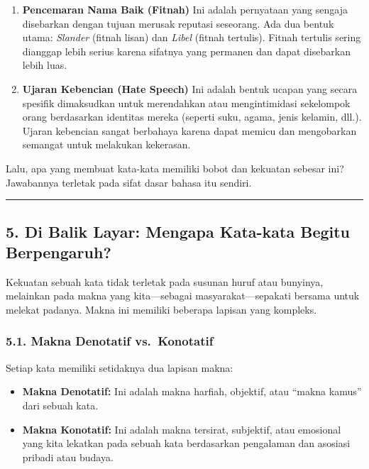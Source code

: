 \documentclass[
  letterpaper,
  DIV=11,
  numbers=noendperiod]{scrreprt}
\begin{document}
\begin{enumerate}
\def\labelenumi{\arabic{enumi}.}
\item
  \textbf{Pencemaran Nama Baik (Fitnah)} Ini adalah pernyataan yang
  sengaja disebarkan dengan tujuan merusak reputasi seseorang. Ada dua
  bentuk utama: \emph{Slander} (fitnah lisan) dan \emph{Libel} (fitnah
  tertulis). Fitnah tertulis sering dianggap lebih serius karena
  sifatnya yang permanen dan dapat disebarkan lebih luas.
\item
  \textbf{Ujaran Kebencian (Hate Speech)} Ini adalah bentuk ucapan yang
  secara spesifik dimaksudkan untuk merendahkan atau mengintimidasi
  sekelompok orang berdasarkan identitas mereka (seperti suku, agama,
  jenis kelamin, dll.). Ujaran kebencian sangat berbahaya karena dapat
  memicu dan mengobarkan semangat untuk melakukan kekerasan.
\end{enumerate}

Lalu, apa yang membuat kata-kata memiliki bobot dan kekuatan sebesar
ini? Jawabannya terletak pada sifat dasar bahasa itu sendiri.

\begin{center}\rule{0.5\linewidth}{0.5pt}\end{center}

\subsection{5. Di Balik Layar: Mengapa Kata-kata Begitu
Berpengaruh?}\label{di-balik-layar-mengapa-kata-kata-begitu-berpengaruh}

Kekuatan sebuah kata tidak terletak pada susunan huruf atau bunyinya,
melainkan pada makna yang kita---sebagai masyarakat---sepakati bersama
untuk melekat padanya. Makna ini memiliki beberapa lapisan yang
kompleks.

\subsubsection{5.1. Makna Denotatif
vs.~Konotatif}\label{makna-denotatif-vs.-konotatif}

Setiap kata memiliki setidaknya dua lapisan makna:

\begin{itemize}
\item
  \textbf{Makna Denotatif:} Ini adalah makna harfiah, objektif, atau
  ``makna kamus'' dari sebuah kata.
\item
  \textbf{Makna Konotatif:} Ini adalah makna tersirat, subjektif, atau
  emosional yang kita lekatkan pada sebuah kata berdasarkan pengalaman
  dan asosiasi pribadi atau budaya.
\end{itemize}
\end{document}
